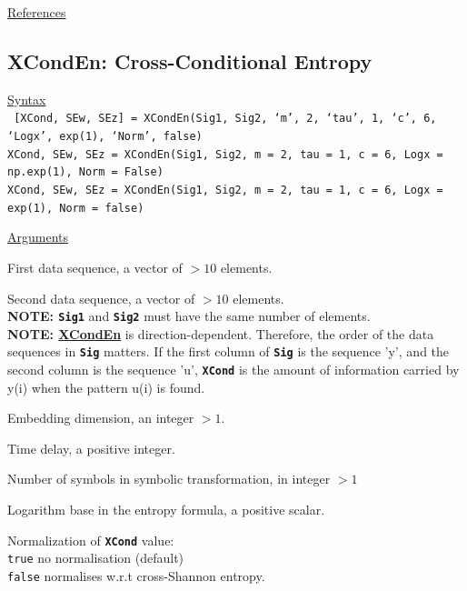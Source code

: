 \documentclass[12pt, a4paper, titlepage, openany]{book}
\begin{document}
\noindent \ul{References}\hspace{1cm}
\cite{XPerm1}



\newpage
\subsection{\normalsize XCondEn: \hspace{15mm} Cross-Conditional Entropy}
\noindent\ul{Syntax} \vspace{6mm} \\ \noindent \texttt{\footnotesize
[XCond, SEw, SEz] = XCondEn(Sig1, Sig2, ‘m’, 2, ‘tau’, 1, ‘c’, 6, ‘Logx’, exp(1), ‘Norm’, false)\\
XCond, SEw, SEz  = XCondEn(Sig1, Sig2, m = 2, tau = 1, c = 6, Logx = np.exp(1), Norm = False) \\
XCond, SEw, SEz  = XCondEn(Sig1, Sig2, m = 2, tau = 1, c = 6, Logx = exp(1), Norm = false)}

\noindent \ul{Arguments}
\begin{description}[labelsep=1cm, labelwidth=2cm, nosep, style=multiline,leftmargin=3cm]\footnotesize
\item[\texttt{Sig1}]	First data sequence, a vector of $>10$ elements.
\item[\texttt{Sig2}]	Second data sequence, a vector of $>10$ elements.\\
\textbf{NOTE: \texttt{Sig1}} and \textbf{\texttt{Sig2}} must have the same number of elements.\\
\textbf{NOTE: \ul{XCondEn}} is direction-dependent. Therefore, the order of the data sequences in \texttt{\textbf{Sig}} matters. If the first column of \texttt{\textbf{Sig}} is the
    sequence 'y', and the second column is the sequence 'u', \texttt{\textbf{XCond}} is  the amount of information carried by y(i) when the pattern u(i) is found.
\item[\texttt{m}]		Embedding dimension, an integer $> 1$.
\item[\texttt{tau}]		Time delay, a positive integer.
\item[\texttt{c}]		Number of symbols in symbolic transformation, in integer $> 1$
\item[\texttt{Logx}]	Logarithm base in the entropy formula, a positive scalar.
\item[\texttt{Norm}]	Normalization of \texttt{\textbf{XCond}} value:\\
		  \texttt{true} \hspace{15pt}  no normalisation (default)\\
		  \texttt{false} \hspace{10pt}  normalises w.r.t cross-Shannon entropy.
\end{description}
\end{document}
